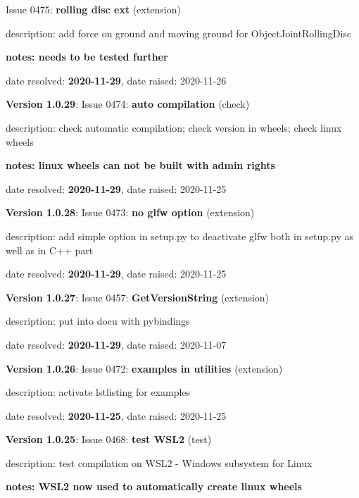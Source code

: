   Issue 0475: {\bf rolling disc ext}
(extension)
  \bi
  \item {\small description: add force on ground and moving ground for ObjectJointRollingDisc}
  \item {\small \bf notes: needs to be tested further}
  \item   date resolved: {\bf 2020-11-29},
date raised: 2020-11-26   \ei
  \item {\bf Version 1.0.29}: \vspace{-6pt} 
  Issue 0474: {\bf auto compilation}
(check)
  \bi
  \item {\small description: check automatic compilation; check version in wheels; check linux wheels}
  \item {\small \bf notes: linux wheels can not be built with admin rights}
  \item   date resolved: {\bf 2020-11-29},
date raised: 2020-11-25   \ei
  \item {\bf Version 1.0.28}: \vspace{-6pt} 
  Issue 0473: {\bf no glfw option}
(extension)
  \bi
  \item {\small description: add simple option in setup.py to deactivate glfw both in setup.py as well as in C++ part}
  \item   date resolved: {\bf 2020-11-29},
date raised: 2020-11-25   \ei
  \item {\bf Version 1.0.27}: \vspace{-6pt} 
  Issue 0457: {\bf GetVersionString}
(extension)
  \bi
  \item {\small description: put into docu with pybindings}
  \item   date resolved: {\bf 2020-11-29},
date raised: 2020-11-07   \ei
  \item {\bf Version 1.0.26}: \vspace{-6pt} 
  Issue 0472: {\bf examples in utilities}
(extension)
  \bi
  \item {\small description: activate lstlisting for examples}
  \item   date resolved: {\bf 2020-11-25},
date raised: 2020-11-25   \ei
  \item {\bf Version 1.0.25}: \vspace{-6pt} 
  Issue 0468: {\bf test WSL2}
(test)
  \bi
  \item {\small description: test compilation on WSL2 - Windows subsystem for Linux}
  \item {\small \bf notes: WSL2 now used to automatically create linux wheels}
